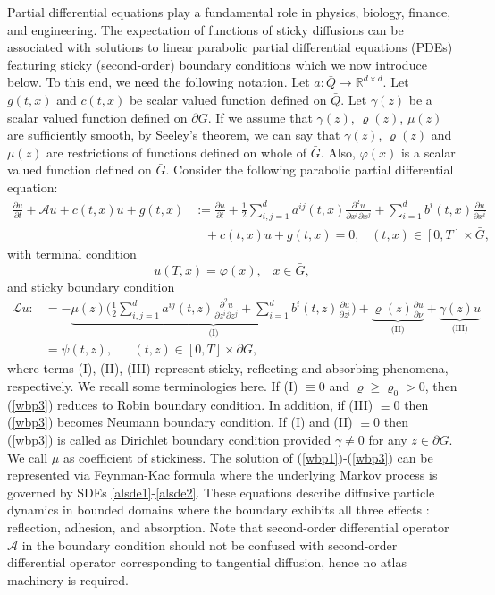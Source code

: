 \documentclass{article}
\theoremstyle{definition}
\numberwithin{equation}{section}
\begin{document}
Partial differential equations play a fundamental role in physics, biology, finance, and engineering. The expectation of functions of sticky diffusions can be associated with solutions to linear parabolic partial differential equations (PDEs) featuring sticky (second-order) boundary conditions which we now
 introduce below. To this end, we need the following notation. Let $a : \bar{Q} \rightarrow \mathbb{R}^{d\times d}$.  Let $g(t,x)$ and $c(t,x)$ be scalar valued function defined on $\bar{Q}$.  Let $\gamma(z)$ be a scalar valued function defined on $\partial G$. If we assume that $\gamma(z)$, $\varrho(z)$, $\mu(z) $ are sufficiently smooth, by Seeley's theorem, we can say that $\gamma(z)$, $\varrho(z)$ and $\mu(z)$ are restrictions of functions defined on whole of $\bar{G}$.  Also, $\varphi(x)$ is a scalar valued function defined on $\bar{G}$.
Consider the following parabolic partial differential equation:
\begin{align}
 \frac{\partial u}{\partial t}  +  \mathcal{A}u  + c(t,x)u + g(t,x)  &:= \frac{\partial u}{\partial t} + \frac{1}{2}\sum\limits_{i,j=1}^{d}a^{ij}(t,x)\frac{\partial^{2}u}{\partial x^{i}\partial x^{j}}  +  \sum\limits_{i=1}^{d}b^{i}(t,x)\frac{\partial u}{\partial x^{i}} \nonumber\\  & \;\;\; + c(t,x)u + g(t,x) = 0,\;\;\; (t,x) \in [0,T]\times \bar{G},  \label{wbp1}
\end{align}
with terminal condition
\begin{equation}
    u(T,x) = \varphi(x),\;\;\; x \in \bar{G},\label{wbp2}
\end{equation}
and sticky boundary condition
\begin{align}\label{wbp3}
     \mathscr{L}u : &= -\underbrace{\mu(z)\bigg(\frac{1}{2}\sum\limits_{i,j=1}^{d}a^{ij}(t,z)\frac{\partial^{2}u}{\partial z^{i}\partial z^{j}} + \sum\limits_{i=1}^{d}b^{i}(t,z)\frac{\partial u}{\partial z^{i}} \bigg)}_{\text{(I)}} + \underbrace{\varrho(z)\frac{\partial u}{\partial \nu}}_{\text{(II)}}  + \underbrace{\gamma(z)u}_{\text{(III)}}\nonumber \\ & 
    = \psi(t,z),\;\;\;\;\;\; (t,z) \in [0,T]\times\partial G,
\end{align}
where terms (I), (II), (III) represent  sticky, reflecting and absorbing phenomena, respectively. We recall some terminologies here. If (I) $\equiv 0 $ and $\varrho \geq \varrho_{0} > 0 $, then (\ref{wbp3}) reduces to Robin boundary condition. In addition, if (III) $\equiv 0$ then (\ref{wbp3}) becomes Neumann boundary condition. If (I) and (II) $\equiv 0$ then (\ref{wbp3}) is called as Dirichlet boundary condition provided $\gamma \neq 0$ for any $z \in \partial G$. We call $\mu$ as coefficient of stickiness.  The solution of (\ref{wbp1})-(\ref{wbp3}) can be represented via Feynman-Kac formula where the underlying Markov process is governed by SDEs \eqref{alsde1}-\eqref{alsde2}.  These equations describe diffusive particle dynamics in bounded domains where the boundary exhibits all three effects :  reflection, adhesion, and absorption.
Note that second-order differential operator $\mathcal{A}$ in the boundary condition should not be confused with second-order differential operator corresponding to tangential diffusion, hence no atlas machinery is required. 
\end{document}
